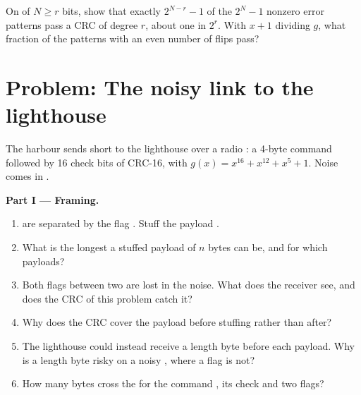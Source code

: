\begin{exercise}[$\star\star\star$]\label{exo:b2:link-layer:12}
On  of $N \ge r$ bits, show that exactly $2^{N-r} - 1$ of the $2^N - 1$ nonzero error patterns pass a CRC of
degree $r$, about one in $2^r$. With $x + 1$ dividing $g$, what fraction of the patterns with an even number of
flips pass?
\end{exercise}

\section{Problem: The noisy link to the lighthouse}\label{sec:b2:link-layer:problem}

\begin{problem}\label{pb:b2:link-layer:1}
The harbour sends short  to the lighthouse over a radio : a 4-byte command followed by 16 check bits of
CRC-16, with $g(x) = x^{16} + x^{12} + x^5 + 1$. Noise comes in .

\medskip\noindent\textbf{Part I --- Framing.}\par\nopagebreak
\begin{enumerate}
\item {} are separated by the flag . Stuff the payload .
\item What is the longest a stuffed payload of $n$ bytes can be, and for which payloads?
\item Both flags between two  are lost in the noise. What does the receiver see, and does the CRC of this
problem catch it?
\item Why does the CRC cover the payload before stuffing rather than after?
\item The lighthouse could instead receive a length byte before each payload. Why is a length byte risky on a noisy
, where a flag is not?
\item How many bytes cross the  for the command , its check and two flags?
\end{enumerate}


\end{problem}
